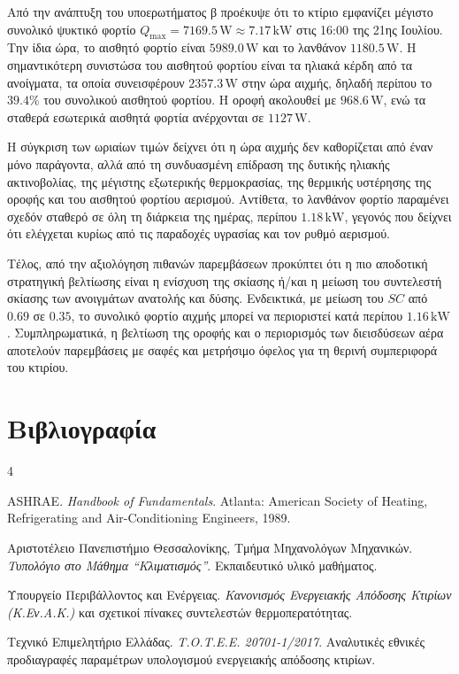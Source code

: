 \documentclass[12pt,a4paper]{article}
\begin{document}
Από την ανάπτυξη του υποερωτήματος β προέκυψε ότι το κτίριο εμφανίζει μέγιστο
συνολικό ψυκτικό φορτίο \(Q_{\max}=7169.5\,\mathrm{W}\approx 7.17\,\mathrm{kW}\)
στις 16:00 της 21ης Ιουλίου. Την ίδια ώρα, το αισθητό φορτίο είναι
\(5989.0\,\mathrm{W}\) και το λανθάνον \(1180.5\,\mathrm{W}\). Η σημαντικότερη
συνιστώσα του αισθητού φορτίου είναι τα ηλιακά κέρδη από τα ανοίγματα, τα οποία
συνεισφέρουν \(2357.3\,\mathrm{W}\) στην ώρα αιχμής, δηλαδή περίπου το \(39.4\%\)
του συνολικού αισθητού φορτίου. Η οροφή ακολουθεί με \(968.6\,\mathrm{W}\), ενώ
τα σταθερά εσωτερικά αισθητά φορτία ανέρχονται σε \(1127\,\mathrm{W}\).

Η σύγκριση των ωριαίων τιμών δείχνει ότι η ώρα αιχμής δεν καθορίζεται από έναν
μόνο παράγοντα, αλλά από τη συνδυασμένη επίδραση της δυτικής ηλιακής ακτινοβολίας,
της μέγιστης εξωτερικής θερμοκρασίας, της θερμικής υστέρησης της οροφής και του
αισθητού φορτίου αερισμού. Αντίθετα, το λανθάνον φορτίο παραμένει σχεδόν σταθερό
σε όλη τη διάρκεια της ημέρας, περίπου \(1.18\,\mathrm{kW}\), γεγονός που δείχνει
ότι ελέγχεται κυρίως από τις παραδοχές υγρασίας και τον ρυθμό αερισμού.

Τέλος, από την αξιολόγηση πιθανών παρεμβάσεων προκύπτει ότι η πιο αποδοτική
στρατηγική βελτίωσης είναι η ενίσχυση της σκίασης ή/και η μείωση του συντελεστή
σκίασης των ανοιγμάτων ανατολής και δύσης. Ενδεικτικά, με μείωση του
\(SC\) από \(0.69\) σε \(0.35\), το συνολικό φορτίο αιχμής μπορεί να περιοριστεί
κατά περίπου \(1.16\,\mathrm{kW}\). Συμπληρωματικά, η βελτίωση της οροφής και ο
περιορισμός των διεισδύσεων αέρα αποτελούν παρεμβάσεις με σαφές και μετρήσιμο
όφελος για τη θερινή συμπεριφορά του κτιρίου.

\section{Βιβλιογραφία}

\begin{thebibliography}{4}

\textenglish{ASHRAE}. \textit{Handbook of Fundamentals}. Atlanta: American Society
of Heating, Refrigerating and Air-Conditioning Engineers, 1989.

Αριστοτέλειο Πανεπιστήμιο Θεσσαλονίκης, Τμήμα Μηχανολόγων Μηχανικών.
\textit{Τυπολόγιο στο Μάθημα ``Κλιματισμός''}. Εκπαιδευτικό υλικό μαθήματος.

Υπουργείο Περιβάλλοντος και Ενέργειας. \textit{Κανονισμός Ενεργειακής Απόδοσης
Κτιρίων (Κ.Εν.Α.Κ.)} και σχετικοί πίνακες συντελεστών θερμοπερατότητας.

Τεχνικό Επιμελητήριο Ελλάδας. \textit{Τ.Ο.Τ.Ε.Ε. 20701-1/2017}. Αναλυτικές
εθνικές προδιαγραφές παραμέτρων υπολογισμού ενεργειακής απόδοσης κτιρίων.

\end{thebibliography}
\end{document}
